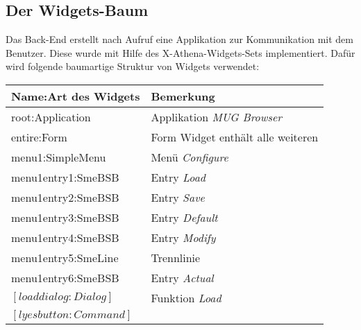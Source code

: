 \subsection{Der Widgets-Baum}

Das Back-End erstellt nach Aufruf eine Applikation zur Kommunikation mit dem Benutzer. Diese wurde mit Hilfe des X-Athena-Widgets-Sets implementiert. Daf\"ur wird folgende baumartige Struktur von Widgets verwendet:

\bigskip
\begin{tabular}{|l|l|}
\hline
Name:Art des Widgets     &                               Bemerkung     \\
\hline
root:Application                                   &     Applikation {\it MUG Browser}           \\
\hspace{0.5cm}        entire:Form                                &     Form Widget enth\"alt alle weiteren \\
\hspace{0.5cm}                menu1:SimpleMenu                   &     Men\"u {\it Configure}                  \\
\hspace{1.0cm}                        menu1entry1:SmeBSB         &     Entry {\it Load}                        \\
\hspace{1.0cm}                        menu1entry2:SmeBSB         &     Entry {\it Save}                        \\
\hspace{1.0cm}                        menu1entry3:SmeBSB         &     Entry {\it Default}                     \\
\hspace{1.0cm}                        menu1entry4:SmeBSB         &     Entry {\it Modify}                     \\
\hspace{1.0cm}                        menu1entry5:SmeLine        &     Trennlinie                         \\
\hspace{1.0cm}                        menu1entry6:SmeBSB         &     Entry {\it Actual}                     \\
\hspace{0.5cm}                $[loaddialog:Dialog]$                &     Funktion {\it Load}                    \\
\hspace{1.0cm}                        $[lyesbutton:Command]$       &                                       \\

\end{tabular}
